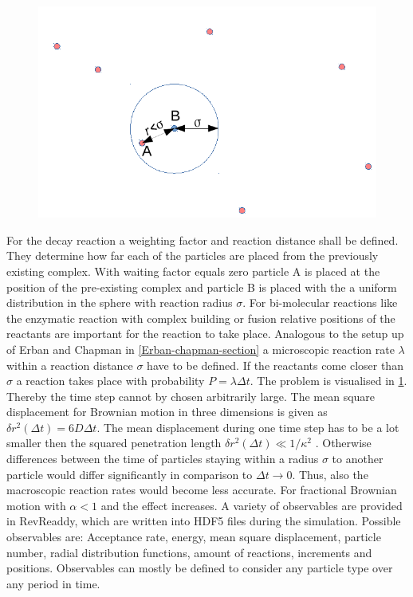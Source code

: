 \documentclass[
  a4paper,BCOR10mm,oneside,
  headsepline,footsepline,%
  fleqn,openbib
]{scrbook}
\begin{document}
\begin{figure} 
  \centering
  \includegraphics[width=0.7 \textwidth]{./data/schemeforreacions1.png}
  \captionsetup{width=\linewidth}
  \label{fig:model-reactions}
\end{figure}
\par
For the decay reaction a weighting factor and reaction distance shall be defined. They determine how far each of the particles are placed from the previously existing complex. With waiting factor equals zero particle A is placed at the position of the pre-existing complex and particle B is placed with the a uniform distribution in the sphere with reaction radius $\sigma$. For bi-molecular reactions like the enzymatic reaction with complex building  or fusion  relative positions of the reactants are important for the reaction to take place. Analogous to the setup up of Erban and Chapman in \cref{Erban-chapman-section} a microscopic reaction rate $\lambda$ within a reaction distance $\sigma$ have to be defined. If the reactants come closer than $\sigma$ a reaction takes place with probability $P= \lambda \Delta t$. The problem is visualised in \cref{fig:model-reactions}. Thereby the time step cannot by chosen arbitrarily large. The mean square displacement for Brownian motion in three dimensions is given as $\delta r^2(\Delta t)= 6D \Delta t$. The mean displacement during one time step has to be a lot smaller then the squared penetration length $\delta r^2(\Delta t)\ll 1/\kappa^2$ . Otherwise differences between the time of particles staying within a radius $\sigma$ to another particle would differ significantly in comparison to $\Delta t \rightarrow 0$. Thus, also the macroscopic reaction rates would become less accurate. For fractional Brownian motion with $\alpha<1$ and the effect increases. A variety of observables are provided in RevReaddy, which are written into HDF5 files \cite{hdf5} during the simulation. Possible observables are: Acceptance rate, energy, mean square displacement, particle number, radial distribution functions, amount of reactions, increments and positions. Observables can mostly be defined to consider any particle type over any period in time. 
\end{document}
